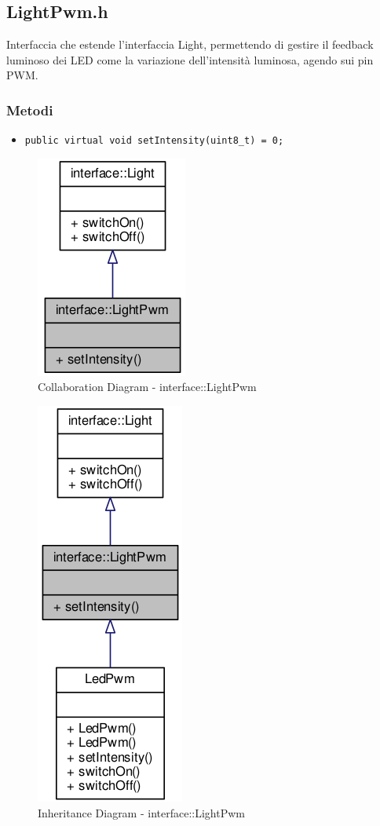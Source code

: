 \subsection{LightPwm.h}
Interfaccia che estende l'interfaccia Light, permettendo di gestire il feedback luminoso dei LED come la variazione dell'intensità luminosa, agendo sui pin PWM.
\subsubsection{Metodi}
\begin{itemize}
	\item \texttt{public virtual void setIntensity(uint8\_t) = 0;}
\end{itemize}
\begin{figure}[!ht]
	\centering
	\includegraphics[scale=.45]{img/UML/CollaborationDiagram/interface/interface::LightPwm.png}
	\caption{Collaboration Diagram - interface::LightPwm}
\end{figure}
\begin{figure}[!ht]
	\centering
	\includegraphics[scale=.35]{img/UML/InheritanceDiagram/interface/interface::LightPwm.png}
	\caption{Inheritance Diagram - interface::LightPwm}
\end{figure}

